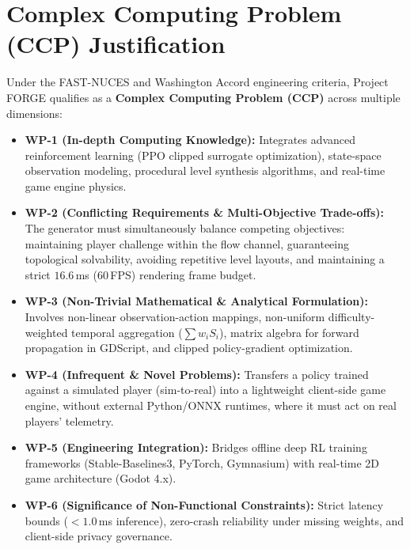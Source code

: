 \section{Complex Computing Problem (CCP) Justification}
Under the FAST-NUCES and Washington Accord engineering criteria, Project FORGE qualifies as a \textbf{Complex Computing Problem (CCP)} across multiple dimensions:
\begin{itemize}
    \item \textbf{WP-1 (In-depth Computing Knowledge):} Integrates advanced reinforcement learning (PPO clipped surrogate optimization), state-space observation modeling, procedural level synthesis algorithms, and real-time game engine physics.
    \item \textbf{WP-2 (Conflicting Requirements \& Multi-Objective Trade-offs):} The generator must simultaneously balance competing objectives: maintaining player challenge within the flow channel, guaranteeing topological solvability, avoiding repetitive level layouts, and maintaining a strict $16.6$\,ms (60\,FPS) rendering frame budget.
    \item \textbf{WP-3 (Non-Trivial Mathematical \& Analytical Formulation):} Involves non-linear observation-action mappings, non-uniform difficulty-weighted temporal aggregation ($\sum w_i S_i$), matrix algebra for forward propagation in GDScript, and clipped policy-gradient optimization.
    \item \textbf{WP-4 (Infrequent \& Novel Problems):} Transfers a policy trained against a simulated player (sim-to-real) into a lightweight client-side game engine, without external Python/ONNX runtimes, where it must act on real players' telemetry.
    \item \textbf{WP-5 (Engineering Integration):} Bridges offline deep RL training frameworks (Stable-Baselines3, PyTorch, Gymnasium) with real-time 2D game architecture (Godot 4.x).
    \item \textbf{WP-6 (Significance of Non-Functional Constraints):} Strict latency bounds ($<1.0$\,ms inference), zero-crash reliability under missing weights, and client-side privacy governance.
\end{itemize}

